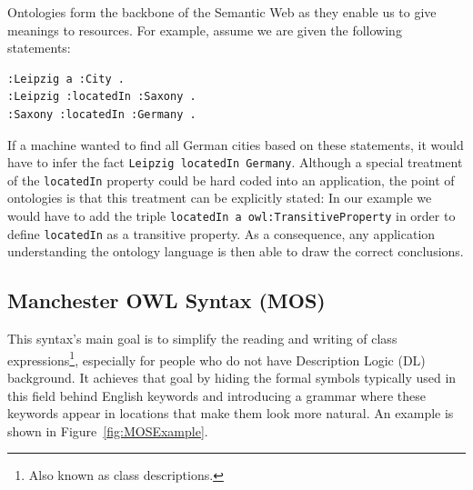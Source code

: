 Ontologies form the backbone of the Semantic Web as they enable us to give
meanings to resources.
For example, assume we are given the following statements:

\begin{listing}[!h]
\centering
\begin{verbatim}
:Leipzig a :City .
:Leipzig :locatedIn :Saxony .
:Saxony :locatedIn :Germany .
\end{verbatim}
\caption{Simple RDF graph in Turtle syntax}
\label{fig:turtle-example}
\end{listing}

If a machine wanted to find all German cities based on these
statements, it would have to infer the fact \texttt{Leipzig locatedIn Germany}. Although a
special treatment of the \texttt{locatedIn} property could be hard coded into an
application, the point of ontologies is that this treatment can be explicitly
stated: In our example we would have to add the triple
\texttt{locatedIn a owl:TransitiveProperty} in order to define
\texttt{locatedIn} as a transitive property. As a consequence, any application
understanding the ontology language is then able to draw the correct
conclusions.


\subsection{Manchester OWL Syntax (MOS)}
\label{sec:MOS}
This syntax's main goal is to simplify the reading and writing of class
expressions\footnote{Also known as class descriptions.},
especially for people who do not have Description Logic (DL)
background\cite{ManchesterOWLSyntax}. It achieves that goal by
hiding the formal symbols typically used in this field behind English
keywords and introducing a grammar where these keywords appear in locations
that make them look more natural. An example is shown in
Figure~\ref{fig:MOSExample}.


